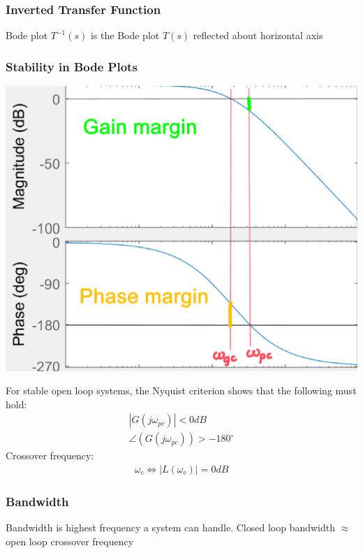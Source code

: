     \subsubsection{Inverted Transfer Function}
        Bode plot $T^{-1}(s)$ is the Bode plot $T(s)$ reflected about horizontal axis

    \subsubsection{Stability in Bode Plots}
        \begin{minipage}{0.64 \linewidth}
                \includegraphics[width = \linewidth]{src/images/gain_phase_margin.png}
        \end{minipage}
        \begin{minipage}{0.34 \linewidth}
            For stable open loop systems, the Nyquist criterion shows that the following must hold:
            \begin{align*}
                |G(j \omega_{pc})| < 0 dB\\
                \angle(G(j \omega_{pc})) > -180^{\circ}
            \end{align*}
            Crossover frequency:
            \begin{align*}
                \omega_{c} \Leftrightarrow |L(\omega_c)| = 0dB
            \end{align*}
        \end{minipage}

    

    \subsubsection{Bandwidth}
        Bandwidth is highest frequency a system can handle. Closed loop bandwidth $\approx$ open loop crossover frequency
        
